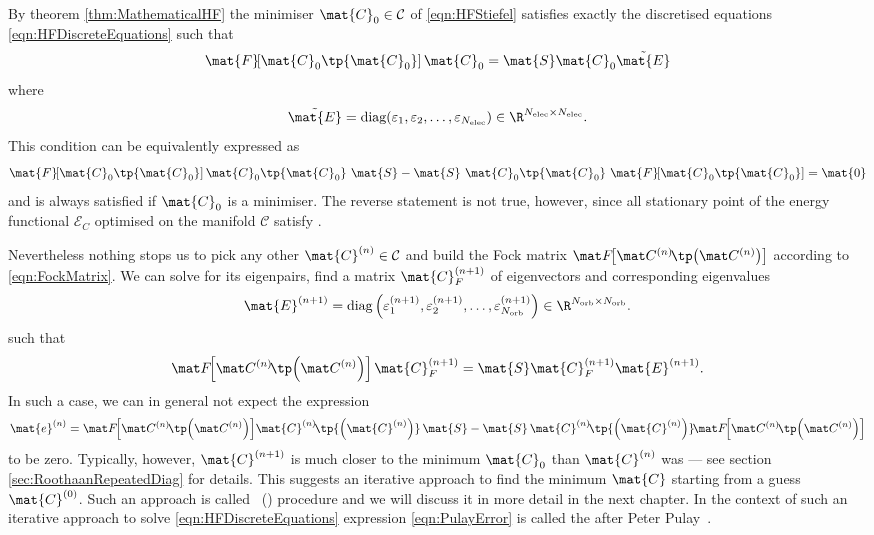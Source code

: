 \begin{rem}
\label{rem:PropertiesDiscretised}
By theorem \vref{thm:MathematicalHF}
the minimiser $\mat{C}_0 \in \mathcal{C}$ of \eqref{eqn:HFStiefel}
satisfies exactly the discretised \HF equations \eqref{eqn:HFDiscreteEquations}
such that
\newcommand{\matFzfull}{\mat{F}\!\!\left[\mat{C}_0\tp{\mat{C}_0}\right]}
\[
	\matFzfull \mat{C}_0 = \mat{S} \mat{C}_0 \tilde{\mat{E}}
\]
where
\[
	\tilde{\mat{E}} = \text{diag}(\varepsilon_1, \varepsilon_2, \ldots,
		\varepsilon_{\Nelec}) \in \R^{\Nelec \times \Nelec}.
\]
This condition can be equivalently expressed as~\cite{Pulay1982}
\begin{equation}
	\matFzfull \mat{C}_0\tp{\mat{C}_0} \
	\mat{S} - \mat{S} \ \mat{C}_0\tp{\mat{C}_0} \ \matFzfull
	= \mat{0}
	\label{eqn:HFconvergenceCondition}
\end{equation}
and is always satisfied if $\mat{C}_0$ is a minimiser.
The reverse statement is not true, however,
since all stationary point of the energy functional
$\mathcal{E}_C$ optimised on the manifold $\mathcal{C}$
satisfy \label{eqn:HFconvergenceCondition}.

Nevertheless nothing stops us to pick any other $\mat{C}^{(n)} \in \mathcal{C}$
and build the Fock matrix $\matFnfull$
according to \eqref{eqn:FockMatrix}.
We can solve for its eigenpairs, \ie find a matrix $\mat{C}_F^{(n+1)}$
of eigenvectors and corresponding eigenvalues
\[
	\mat{E}^{(n+1)}
	= \text{diag}\left(\varepsilon_1^{(n+1)},
	\varepsilon_2^{(n+1)}, \ldots,
	\varepsilon_{\Norb}^{(n+1)}\right) \in \R^{\Norb \times \Norb}.
\]
such that
\begin{equation}
	\matFnfull \mat{C}_F^{(n+1)} = \mat{S} \mat{C}_F^{(n+1)} \mat{E}^{(n+1)}.
	\label{eqn:HFiterated}
\end{equation}
In such a case, we can in general not expect the expression
\begin{equation}
	\mat{e}^{(n)}
	= \matFnfull \! \mat{C}^{(n)}\!\tp{\left(\mat{C}^{(n)}\right)} \, \mat{S}
	- \mat{S} \, \mat{C}^{(n)}\!\tp{\left(\mat{C}^{(n)}\right)} \! \matFnfull
	\label{eqn:PulayError}
\end{equation}
to be zero.
Typically, however, $\mat{C}^{(n+1)}$ is
much closer to the minimum $\mat{C}_0$ than $\mat{C}^{(n)}$
was --- see section \vref{sec:RoothaanRepeatedDiag} for details.
This suggests an iterative approach to find the minimum $\mat{C}$
starting from a guess $\mat{C}^{(0)}$.
Such an approach is called ~(\SCF) procedure
and we will discuss it in more detail in the next chapter.
In the context of such an iterative approach
to solve \eqref{eqn:HFDiscreteEquations}
expression \eqref{eqn:PulayError} is called the 
after Peter Pulay~\cite{Pulay1982}.


\end{rem}
